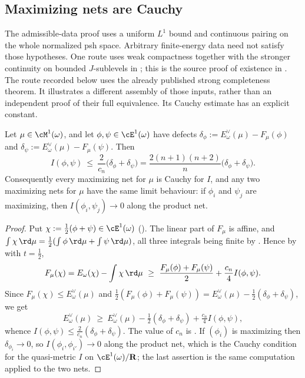 \subsection{Maximizing nets are Cauchy}
\label{sec:ch47-cauchy}

The admissible-data proof uses a uniform $L^1$ bound and continuous
pairing on the whole normalized psh space. Arbitrary finite-energy data
need not satisfy those hypotheses. One route uses weak compactness together
with the stronger continuity on bounded $J$-sublevels in
\cite[Proposition~9.19]{BJ22}; this is the source proof of existence in
\cite[Theorem~12.8]{BJ22}. The route recorded below uses the already published strong
completeness theorem. It illustrates a different assembly of those
inputs, rather than an independent proof of their full equivalence.
Its Cauchy estimate has an explicit constant.

\begin{proposition}
\label{prop:ch47-maximizing-cauchy}
Let $\mu\in\cM^1(\omega)$, and let $\phi,\psi\in\cE^1(\omega)$ have
defects $\delta_\phi:=E^\vee_\omega(\mu)-F_\mu(\phi)$ and
$\delta_\psi:=E^\vee_\omega(\mu)-F_\mu(\psi)$.  Then
\[
 I(\phi,\psi)\ \le\ \frac{2}{c_n}\bigl(\delta_\phi+\delta_\psi\bigr)
 =\frac{2(n+1)(n+2)}{n}\bigl(\delta_\phi+\delta_\psi\bigr).
\]
Consequently every maximizing net for $\mu$ is Cauchy for $I$, and any
two maximizing nets for $\mu$ have the same limit behaviour: if
$\phi_i$ and $\psi_j$ are maximizing, then
$I(\phi_i,\psi_j)\to0$ along the product net.
\end{proposition}

\begin{proof}
Put $\chi:=\tfrac12(\phi+\psi)\in\cE^1(\omega)$
().  The linear part of $F_\mu$ is affine, and
$\int\chi\,\rd\mu=\tfrac12(\int\phi\,\rd\mu+\int\psi\,\rd\mu)$, all three
integrals being finite by .  Hence by
 with $t=\tfrac12$,
\[
 F_\mu(\chi)
 =E_\omega(\chi)-\int\chi\,\rd\mu
 \ \ge\ \frac{F_\mu(\phi)+F_\mu(\psi)}{2}+\frac{c_n}{4}I(\phi,\psi).
\]
Since $F_\mu(\chi)\le E^\vee_\omega(\mu)$ and
$\tfrac12(F_\mu(\phi)+F_\mu(\psi))
=E^\vee_\omega(\mu)-\tfrac12(\delta_\phi+\delta_\psi)$, we get
\[
 E^\vee_\omega(\mu)\ \ge\ E^\vee_\omega(\mu)
 -\tfrac12(\delta_\phi+\delta_\psi)+\tfrac{c_n}{4}I(\phi,\psi),
\]
whence $I(\phi,\psi)\le\frac{2}{c_n}(\delta_\phi+\delta_\psi)$.  The
value of $c_n$ is .  If
$(\phi_i)$ is maximizing then $\delta_{\phi_i}\to0$, so
$I(\phi_i,\phi_{i'})\to0$ along the product net, which is the Cauchy
condition for the quasi-metric $I$ on $\cE^1(\omega)/\mathbf R$; the
last assertion is the same computation applied to the two nets.
\end{proof}

